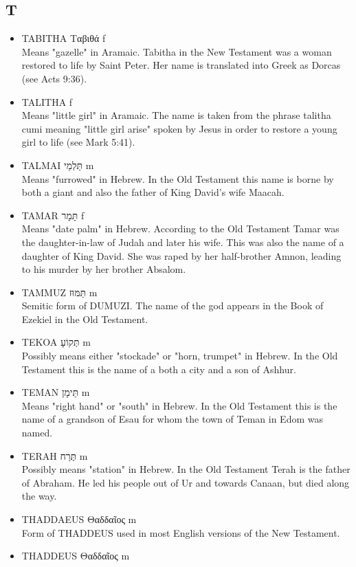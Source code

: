 \subsection{T}
\begin{itemize}
\itemsep-.5em 
\item TABITHA Ταβιθά f \\
Means "gazelle" in Aramaic. Tabitha in the New Testament was a woman restored to life by Saint Peter. Her name is translated into Greek as Dorcas (see Acts 9:36). 
\item TALITHA f \\
Means "little girl" in Aramaic. The name is taken from the phrase talitha cumi meaning "little girl arise" spoken by Jesus in order to restore a young girl to life (see Mark 5:41).
\item TALMAI תַּלְמַי m\\
Means "furrowed" in Hebrew. In the Old Testament this name is borne by both a giant and also the father of King David's wife Maacah.
\item TAMAR תָּמָר f \\
Means "date palm" in Hebrew. According to the Old Testament Tamar was the daughter-in-law of Judah and later his wife. This was also the name of a daughter of King David. She was raped by her half-brother Amnon, leading to his murder by her brother Absalom. 
\item TAMMUZ תַּמּוּז m \\
Semitic form of DUMUZI. The name of the god appears in the Book of Ezekiel in the Old Testament.
\item TEKOA תְּקוֹעָ m \\
Possibly means either "stockade" or "horn, trumpet" in Hebrew. In the Old Testament this is the name of a both a city and a son of Ashhur.
\item TEMAN תֵּימָן m \\
Means "right hand" or "south" in Hebrew. In the Old Testament this is the name of a grandson of Esau for whom the town of Teman in Edom was named.
\item TERAH תֶּרַח m \\
Possibly means "station" in Hebrew. In the Old Testament Terah is the father of Abraham. He led his people out of Ur and towards Canaan, but died along the way.
\item THADDAEUS Θαδδαῖος m \\
Form of THADDEUS used in most English versions of the New Testament.
\item THADDEUS Θαδδαῖος m \\

\end{itemize}
